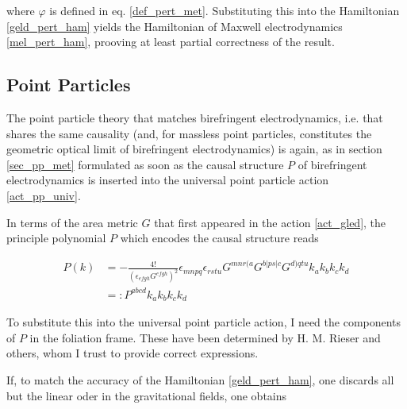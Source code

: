 \documentclass[11pt]{article}
\begin{document}
where $\varphi$ is defined in eq. \ref{def_pert_met}. Substituting this into the Hamiltonian \ref{geld_pert_ham} yields the Hamiltonian of Maxwell electrodynamics \ref{mel_pert_ham}, prooving at least partial correctness of the result.

\subsection{Point Particles} \label{sec_pp_am}

The point particle theory that matches birefringent electrodynamics, i.e. that shares the same causality (and, for massless point particles, constitutes the geometric optical limit of birefringent electrodynamics) is again, as in section \ref{sec_pp_met} formulated as soon as the causal structure $P$ of birefringent electrodynamics is inserted into the universal point particle action \ref{act_pp_univ}.

In terms of the area metric $G$ that first appeared in the action \ref{act_gled}, the principle polynomial $P$ which encodes the causal structure reads

\begin{equation}
\begin{split}
	P \left( k \right)
	&= 
	- \frac{4 !}{\left( \epsilon_{e f g h} G^{e f g h }\right)^2}
	\epsilon_{m n p q}
	\epsilon_{r s t u}
	G^{m n r ( a}
	G^{b | p s | c}
	G^{d ) q t u }
	k_a k_b k_c k_d\\
	&=: P^{a b c d} k_a k_b k_c k_d
\end{split}	
\end{equation}

To substitute this into the universal point particle action, I need the components of $P$  in the foliation frame. These have been determined by H. M. Rieser and others, whom I trust to provide correct expressions.

If, to match the accuracy of the  Hamiltonian \ref{geld_pert_ham}, one discards all but the linear oder in the gravitational fields, one obtains
\end{document}
